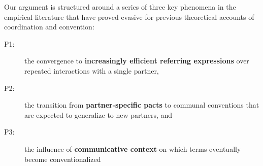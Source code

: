 
Our argument is structured around a series of three key phenomena in the empirical literature that have proved evasive for previous theoretical accounts of coordination and convention: 
\begin{description}
\item[P1:] the convergence to \textbf{increasingly efficient referring expressions} over repeated interactions with a single partner,
\item[P2:] the transition from \textbf{partner-specific pacts} to communal conventions that are expected to generalize to new partners, and
\item[P3:] the influence of \textbf{communicative context} on which terms eventually become conventionalized 
\end{description}

